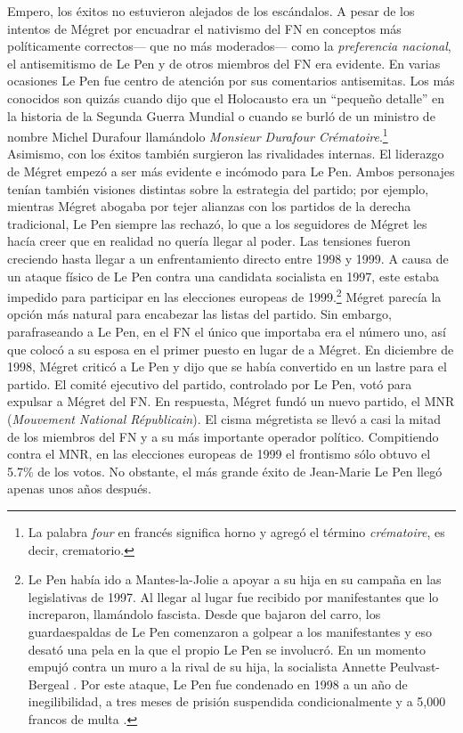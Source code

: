 Empero, los éxitos no estuvieron alejados de los escándalos. A pesar de los intentos de Mégret por encuadrar el nativismo del FN en conceptos más políticamente correctos--- que no más moderados--- como la \textit{preferencia nacional}, el antisemitismo de Le Pen y de otros miembros del FN era evidente. En varias ocasiones Le Pen fue centro de atención por sus comentarios antisemitas. Los más conocidos son quizás cuando dijo que el Holocausto era un ``pequeño detalle'' en la historia de la Segunda Guerra Mundial o cuando se burló de un ministro de nombre Michel Durafour llamándolo \textit{Monsieur Durafour Crématoire}.\footnote{La palabra \textit{four} en francés significa horno y agregó el término \textit{crématoire}, es decir, crematorio.}\\ 

Asimismo, con los éxitos también surgieron las rivalidades internas. El liderazgo de Mégret empezó a ser más evidente e incómodo para Le Pen. Ambos personajes tenían también visiones distintas sobre la estrategia del partido; por ejemplo, mientras Mégret abogaba por tejer alianzas con los partidos de la derecha tradicional, Le Pen siempre las rechazó, lo que a los seguidores de Mégret les hacía creer que en realidad no quería llegar al poder. Las tensiones fueron creciendo hasta llegar a un enfrentamiento directo entre 1998 y 1999. A causa de un ataque físico de Le Pen contra una candidata socialista en 1997, este estaba impedido para participar en las elecciones europeas de 1999.\footnote{Le Pen había ido a Mantes-la-Jolie a apoyar a su hija en su campaña en las legislativas de 1997. Al llegar al lugar fue recibido por manifestantes que lo increparon, llamándolo fascista. Desde que bajaron del carro, los guardaespaldas de Le Pen comenzaron a golpear a los manifestantes y eso desató una pela en la que el propio Le Pen se involucró. En un momento empujó contra un muro a la rival de su hija, la socialista Annette Peulvast-Bergeal \parencite[ver video en][seg. 49]{InaPolitique97}. Por este ataque, Le Pen fue condenado en 1998 a un año de inegilibilidad, a tres meses de prisión suspendida condicionalmente y a 5,000 francos de multa \parencite{LesEchos99}.} Mégret parecía la opción más natural para encabezar las listas del partido. Sin embargo, parafraseando a Le Pen, en el FN el único que importaba era el número uno, así que colocó a su esposa en el primer puesto en lugar de a Mégret. En diciembre de 1998, Mégret criticó a Le Pen y dijo que se había convertido en un lastre para el partido. El comité ejecutivo del partido, controlado por Le Pen, votó para expulsar a Mégret del FN. En respuesta, Mégret fundó un nuevo partido, el MNR (\textit{Mouvement National Républicain}). El cisma mégretista se llevó a casi la mitad de los miembros del FN y a su más importante operador político. Compitiendo contra el MNR, en las elecciones europeas de 1999 el frontismo sólo obtuvo el 5.7\% de los votos. No obstante, el más grande éxito de Jean-Marie Le Pen llegó apenas unos años después.\\ 

